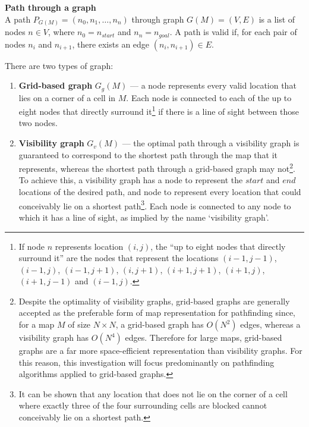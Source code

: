 \documentclass[12pt,notitlepage]{report}
\begin{document}
\begin{description}
\item{\bfseries Path through a graph}\\
A path $P_{G(M)} = (n_{0}, n_{1}, \ldots, n_{n})$ through graph $G(M)=(V,E)$ is a list of nodes $n \in V$, where $n_{0}=n_{start}$ and $n_{n}=n_{goal}$. A path is valid if, for each pair of nodes $n_{i}$ and $n_{i+1}$, there exists an edge $(n_{i},n_{i+1}) \in E$.\\
\end{description}

\noindent
There are two types of graph:
\begin{enumerate}
\item{\bfseries Grid-based graph} $G_{g}(M)$ --- a node represents every valid location that lies on a corner of a cell in $M$. Each node is connected to each of the up to eight nodes that directly surround it\footnote{If node $n$ represents location $(i,j)$, the ``up to eight nodes that directly surround it'' are the nodes that represent the locations $(i-1,j-1)$, $(i-1,j)$, $(i-1,j+1)$, $(i,j+1)$, $(i+1,j+1)$, $(i+1,j)$, $(i+1,j-1)$ and $(i-1,j)$.} if there is a line of sight between those two nodes.\\

\item{\bfseries Visibility graph} $G_{v}(M)$ --- the optimal path through a visibility graph is guaranteed to correspond to the shortest path through the map that it represents, whereas the shortest path through a grid-based graph may not\footnote{Despite the optimality of visibility graphs, grid-based graphs are generally accepted as the preferable form of map representation for pathfinding since, for a map $M$ of size $N \times N$, a grid-based graph has {$O(N^{2})$} edges, whereas a visibility graph has {$O(N^{4})$} edges. Therefore for large maps, grid-based graphs are a far more space-efficient representation than visibility graphs. For this reason, this investigation will focus predominantly on pathfinding algorithms applied to grid-based graphs.}\cite{Nash12}. To achieve this, a visibility graph has a node to represent the $start$ and $end$ locations of the desired path, and node to represent every location that could conceivably lie on a shortest path\footnote{It can be shown\cite{Nash12} that any location that does not lie on the corner of a cell where exactly three of the four surrounding cells are blocked cannot conceivably lie on a shortest path.}. Each node is connected to any node to which it has a line of sight, as implied by the name `visibility graph'.\\

\end{enumerate}
\end{document}
